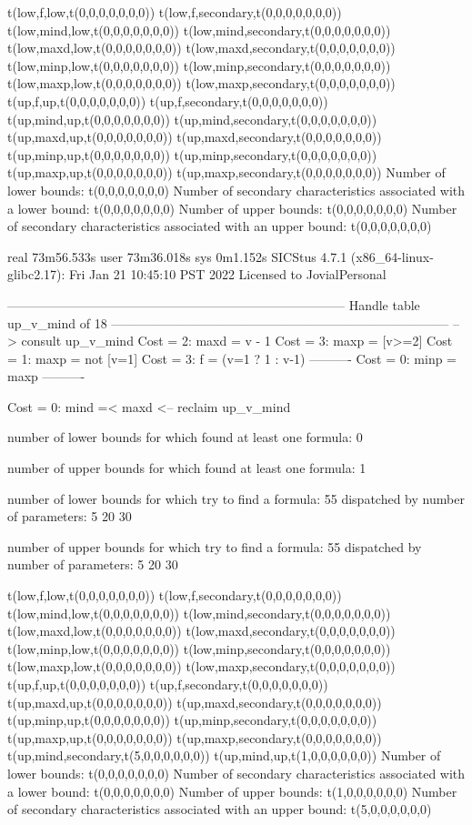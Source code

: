 t(low,f,low,t(0,0,0,0,0,0,0))
t(low,f,secondary,t(0,0,0,0,0,0,0))
t(low,mind,low,t(0,0,0,0,0,0,0))
t(low,mind,secondary,t(0,0,0,0,0,0,0))
t(low,maxd,low,t(0,0,0,0,0,0,0))
t(low,maxd,secondary,t(0,0,0,0,0,0,0))
t(low,minp,low,t(0,0,0,0,0,0,0))
t(low,minp,secondary,t(0,0,0,0,0,0,0))
t(low,maxp,low,t(0,0,0,0,0,0,0))
t(low,maxp,secondary,t(0,0,0,0,0,0,0))
t(up,f,up,t(0,0,0,0,0,0,0))
t(up,f,secondary,t(0,0,0,0,0,0,0))
t(up,mind,up,t(0,0,0,0,0,0,0))
t(up,mind,secondary,t(0,0,0,0,0,0,0))
t(up,maxd,up,t(0,0,0,0,0,0,0))
t(up,maxd,secondary,t(0,0,0,0,0,0,0))
t(up,minp,up,t(0,0,0,0,0,0,0))
t(up,minp,secondary,t(0,0,0,0,0,0,0))
t(up,maxp,up,t(0,0,0,0,0,0,0))
t(up,maxp,secondary,t(0,0,0,0,0,0,0))
Number of lower bounds:                                             t(0,0,0,0,0,0,0)
Number of secondary characteristics associated with a lower bound:  t(0,0,0,0,0,0,0)
Number of upper bounds:                                             t(0,0,0,0,0,0,0)
Number of secondary characteristics associated with an upper bound: t(0,0,0,0,0,0,0)

real	73m56.533s
user	73m36.018s
sys	0m1.152s
SICStus 4.7.1 (x86_64-linux-glibc2.17): Fri Jan 21 10:45:10 PST 2022
Licensed to JovialPersonal


--------------------------------------------------------------------------------
Handle table up_v_mind of 18
--------------------------------------------------------------------------------
--> consult up_v_mind
Cost =  2:  maxd = v - 1
Cost =  3:  maxp = [v>=2]
Cost =  1:  maxp = not [v=1]
Cost =  3:  f    = (v=1 ? 1 : v-1)
----------
Cost =  0:  minp = maxp
----------

Cost =  0:  mind =< maxd
<-- reclaim up_v_mind

number of lower bounds for which found at least one formula: 0

number of upper bounds for which found at least one formula: 1

number of lower bounds for which try to find a formula: 55
dispatched by number of parameters: 5  20  30

number of upper bounds for which try to find a formula: 55
dispatched by number of parameters: 5  20  30

t(low,f,low,t(0,0,0,0,0,0,0))
t(low,f,secondary,t(0,0,0,0,0,0,0))
t(low,mind,low,t(0,0,0,0,0,0,0))
t(low,mind,secondary,t(0,0,0,0,0,0,0))
t(low,maxd,low,t(0,0,0,0,0,0,0))
t(low,maxd,secondary,t(0,0,0,0,0,0,0))
t(low,minp,low,t(0,0,0,0,0,0,0))
t(low,minp,secondary,t(0,0,0,0,0,0,0))
t(low,maxp,low,t(0,0,0,0,0,0,0))
t(low,maxp,secondary,t(0,0,0,0,0,0,0))
t(up,f,up,t(0,0,0,0,0,0,0))
t(up,f,secondary,t(0,0,0,0,0,0,0))
t(up,maxd,up,t(0,0,0,0,0,0,0))
t(up,maxd,secondary,t(0,0,0,0,0,0,0))
t(up,minp,up,t(0,0,0,0,0,0,0))
t(up,minp,secondary,t(0,0,0,0,0,0,0))
t(up,maxp,up,t(0,0,0,0,0,0,0))
t(up,maxp,secondary,t(0,0,0,0,0,0,0))
t(up,mind,secondary,t(5,0,0,0,0,0,0))
t(up,mind,up,t(1,0,0,0,0,0,0))
Number of lower bounds:                                             t(0,0,0,0,0,0,0)
Number of secondary characteristics associated with a lower bound:  t(0,0,0,0,0,0,0)
Number of upper bounds:                                             t(1,0,0,0,0,0,0)
Number of secondary characteristics associated with an upper bound: t(5,0,0,0,0,0,0)

